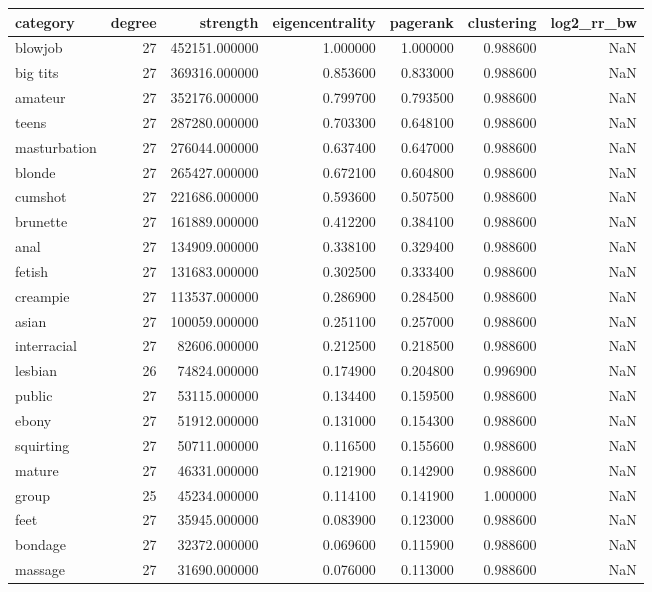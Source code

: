 \begin{tabular}{lrrrrrr}
\toprule
category & degree & strength & eigencentrality & pagerank & clustering & log2_rr_bw \\
\midrule
blowjob & 27 & 452151.000000 & 1.000000 & 1.000000 & 0.988600 & NaN \\
big tits & 27 & 369316.000000 & 0.853600 & 0.833000 & 0.988600 & NaN \\
amateur & 27 & 352176.000000 & 0.799700 & 0.793500 & 0.988600 & NaN \\
teens & 27 & 287280.000000 & 0.703300 & 0.648100 & 0.988600 & NaN \\
masturbation & 27 & 276044.000000 & 0.637400 & 0.647000 & 0.988600 & NaN \\
blonde & 27 & 265427.000000 & 0.672100 & 0.604800 & 0.988600 & NaN \\
cumshot & 27 & 221686.000000 & 0.593600 & 0.507500 & 0.988600 & NaN \\
brunette & 27 & 161889.000000 & 0.412200 & 0.384100 & 0.988600 & NaN \\
anal & 27 & 134909.000000 & 0.338100 & 0.329400 & 0.988600 & NaN \\
fetish & 27 & 131683.000000 & 0.302500 & 0.333400 & 0.988600 & NaN \\
creampie & 27 & 113537.000000 & 0.286900 & 0.284500 & 0.988600 & NaN \\
asian & 27 & 100059.000000 & 0.251100 & 0.257000 & 0.988600 & NaN \\
interracial & 27 & 82606.000000 & 0.212500 & 0.218500 & 0.988600 & NaN \\
lesbian & 26 & 74824.000000 & 0.174900 & 0.204800 & 0.996900 & NaN \\
public & 27 & 53115.000000 & 0.134400 & 0.159500 & 0.988600 & NaN \\
ebony & 27 & 51912.000000 & 0.131000 & 0.154300 & 0.988600 & NaN \\
squirting & 27 & 50711.000000 & 0.116500 & 0.155600 & 0.988600 & NaN \\
mature & 27 & 46331.000000 & 0.121900 & 0.142900 & 0.988600 & NaN \\
group & 25 & 45234.000000 & 0.114100 & 0.141900 & 1.000000 & NaN \\
feet & 27 & 35945.000000 & 0.083900 & 0.123000 & 0.988600 & NaN \\
bondage & 27 & 32372.000000 & 0.069600 & 0.115900 & 0.988600 & NaN \\
massage & 27 & 31690.000000 & 0.076000 & 0.113000 & 0.988600 & NaN \\

\end{tabular}

